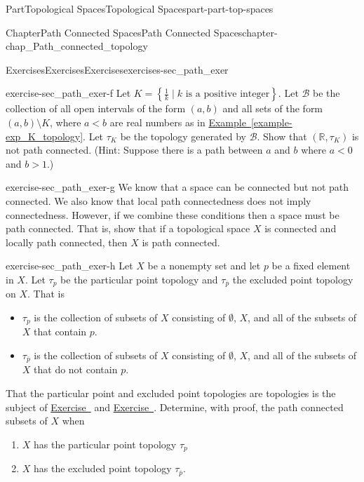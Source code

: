 \documentclass[oneside,10pt,]{book}
\newcommand{\xreffont}{\relax}
\numberwithin{equation}{chapter}
\newcommand{\R}{\mathbb{R}}
\newcommand{\B}{\mathcal{B}}
\newcommand{\lt}{<}
\newcommand{\gt}{>}
\begin{document}
\begin{partptx}{Part}{Topological Spaces}{}{Topological Spaces}{}{}{part-part-top-spaces}
\begin{chapterptx}{Chapter}{Path Connected Spaces}{}{Path Connected Spaces}{}{}{chapter-chap_Path_connected_topology}
\begin{exercises-section}{Exercises}{Exercises}{}{Exercises}{}{}{exercises-sec_path_exer}
\begin{divisionexercise}{6}{}{}{exercise-sec_path_exer-f}
Let  \(K = \left\{\frac{1}{k} \mid k \text{ is a positive integer} \right\}\). Let \(\B\) be the collection of all open intervals of the form \((a,b)\) and all sets of the form \((a,b) \setminus K\), where \(a \lt b\) are real numbers as in \hyperref[example-exp_K_topology]{Example~{\xreffont\ref{example-exp_K_topology}}}. Let \(\tau_K\) be the topology generated by \(\B\). Show that \((\R, \tau_K)\) is not path connected. (Hint: Suppose there is a path between \(a\) and \(b\) where \(a \lt 0\) and \(b \gt 1\).)%
\end{divisionexercise}%
\begin{divisionexercise}{7}{}{}{exercise-sec_path_exer-g}%
We know that a space can be connected but not path connected. We also know that local path connectedness does not imply connectedness. However, if we combine these conditions then a space must be path connected. That is, show that if a topological space \(X\) is connected and locally path connected, then \(X\) is path connected.%
\end{divisionexercise}%
\begin{divisionexercise}{8}{}{}{exercise-sec_path_exer-h}%
Let \(X\) be a nonempty set and let \(p\) be a fixed element in \(X\). Let \(\tau_p\) be the particular point topology and \(\tau_{\overline{p}}\) the excluded point topology on \(X\). That is%
\begin{itemize}[label=\textbullet]
\item{}\(\tau_{p}\) is the collection of subsets of \(X\) consisting of \(\emptyset\), \(X\), and all of the subsets of \(X\) that contain \(p\).%
\item{}\(\tau_{\overline{p}}\) is the collection of subsets of \(X\) consisting of \(\emptyset\), \(X\), and all of the subsets of \(X\) that do not contain \(p\).%
\end{itemize}
That the particular point and excluded point topologies are topologies is the subject of \hyperlink{exercise-ex_particular_point_topology}{Exercise~{\xreffont 9}} and \hyperlink{exercise-ex_excluded_point_topology}{Exercise~{\xreffont 10}}. Determine, with proof, the path connected subsets of \(X\) when%
\begin{enumerate}[font=\bfseries,label=(\alph*),ref=\alph*]%
\item{}\(X\) has the particular point topology \(\tau_p\)%
\item{}\(X\) has the excluded point topology \(\tau_{\overline{p}}\).%
\end{enumerate}%
\end{divisionexercise}%

\end{exercises-section}
\end{chapterptx}
\end{partptx}
\end{document}
